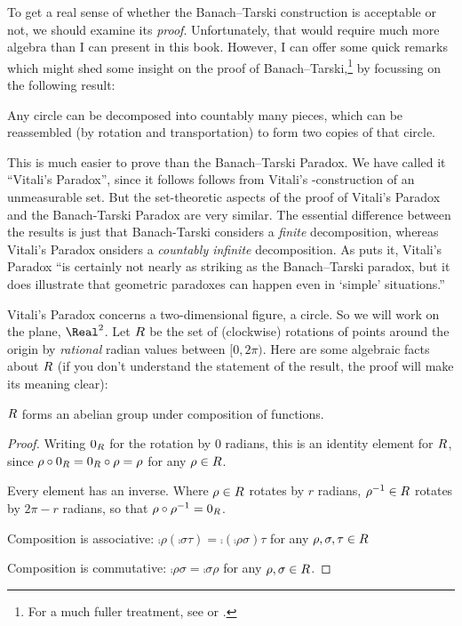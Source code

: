 \documentclass[../../../include/open-logic-section]{subfiles}
\begin{document}

To get a real sense of whether the Banach--Tarski construction is
acceptable or not, we should examine its \emph{proof}. Unfortunately,
that would require much more algebra than I can present in this book.
However, I can offer some quick remarks which might shed some insight
on the proof of Banach--Tarski,\footnote{For a much fuller treatment,
see \cite{WestonUnpublished} or \cite{Wagon2016}.} by focussing on the
following result:

\begin{thm}
Any circle can be decomposed into countably many pieces, which can be
reassembled (by rotation and transportation) to form two copies of
that circle.
\end{thm}

This is much easier to prove than the Banach--Tarski Paradox. We have
called it ``Vitali's Paradox'', since it follows follows from Vitali's
\citeyear{Vitali1905}-construction of an unmeasurable set.  But the
set-theoretic aspects of the proof of Vitali's Paradox and the
Banach-Tarski Paradox are very similar. The essential difference
between the results is just that Banach-Tarski considers a
\emph{finite} decomposition, whereas Vitali's Paradox onsiders a
\emph{countably infinite} decomposition.  As \citet{WestonUnpublished}
puts it, Vitali's Paradox ``is certainly not nearly as striking as the
Banach--Tarski paradox, but it does illustrate that geometric
paradoxes can  happen even in `simple' situations.'' 

Vitali's Paradox concerns a two-dimensional figure, a circle. So we
will work on the plane, $\Real^2$. Let $R$ be the set of
(clockwise) rotations of points around the origin by \emph{rational}
radian values between $[0,2\pi)$. Here are some algebraic facts about
$R$ (if you don't understand the statement of the
result, the proof will make its meaning clear):

\begin{lem}
$R$ forms an abelian {group} under composition of functions.
\end{lem}

\begin{proof}
Writing $0_{R}$ for the rotation by $0$ radians, this is
an identity element for $R$, since
$\rho \circ 0_{R} = 0_{R} \circ \rho =
\rho$ for any $\rho \in R$.

Every element has an inverse. Where $\rho \in R$ rotates
by $r$ radians, $\rho^{-1} \in R$ rotates by $2\pi - r$
radians, so that $\rho \circ \rho^{-1} = 0_R$.

Composition is associative: $\comp{\rho}{(\comp{\sigma}{\tau})} =
\comp{(\comp{\rho}{\sigma})}{\tau}$ for any $\rho, \sigma, \tau \in
R$

Composition is commutative: $\comp{\rho}{\sigma} =
\comp{\sigma}{\rho}$ for any $\rho, \sigma \in R$.
\end{proof}
\end{document}
